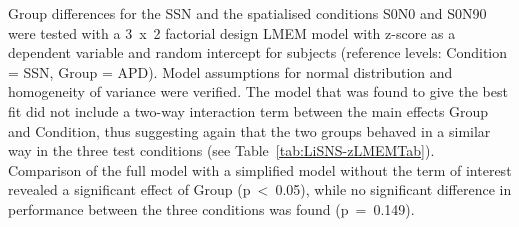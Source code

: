 \documentclass[a4paper, twoside]{templates/ociamthesis}
\begin{document}
\begin{table}

\caption{\label{tab:LiSNS-ztab}LiSNS-UK standard residuals (z-scores) descriptives by group. abnormal: the percentage of abnormal score, defined as: z-score $>$ 1.96 (SSN, S0N0, \& S0N90) and  z-score $<$ 1.96 (SRM). Percentage in brackets were accounted for observations that were trimmed in the z-score calculation procedure.}
\centering
{}
\end{table}

Group differences for the SSN and the spatialised conditions S0N0 and S0N90 were tested with a 3~x~2 factorial design LMEM model with z-score as a dependent variable and random intercept for subjects (reference levels: Condition = SSN, Group = APD). Model assumptions for normal distribution and homogeneity of variance were verified. The model that was found to give the best fit did not include a two-way interaction term between the main effects Group and Condition, thus suggesting again that the two groups behaved in a similar way in the three test conditions (see Table~\ref{tab:LiSNS-zLMEMTab}). Comparison of the full model with a simplified model without the term of interest revealed a significant effect of Group (p~\textless~0.05), while no significant difference in performance between the three conditions was found (p~=~0.149).\\
\end{document}
